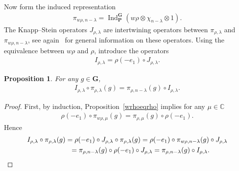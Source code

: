 \documentclass[10pt,a4paper]{amsart}
\DeclareMathOperator{\Ind}{Ind}
\numberwithin{equation}{section}
\newtheorem{prop}[theor]{Proposition}
\begin{document}
Now form the induced representation
\begin{gather*}
\pi_{w \rho, n-\lambda} =\Ind_\mathbf P^\mathbf G (w\rho\otimes \chi_{n-\lambda}\otimes 1) .
\end{gather*}
The Knapp--Stein operators $J_{\rho, \lambda}$ are intertwining operators between $\pi_{ \rho, \lambda}$ and $\pi_{w \rho, n-\lambda}$, see again~\cite{kn} for general information on these operators. Using the equivalence between $w \rho$ and $ \rho$, introduce the operators
\begin{gather*}
I_{ \rho, \lambda} = \rho(-e_1)\circ J_{ \rho, \lambda} .
\end{gather*}

\begin{prop} For any $g\in \mathbf G$,
\begin{gather*}
I_{ \rho,\lambda}\circ \pi_{ \rho,\lambda}(g) = \pi_{ \rho, n-\lambda}(g) \circ I_{ \rho,\lambda} .
\end{gather*}
\end{prop}

\begin{proof}
First, by induction, Proposition~\ref{wrhoeqrho} implies for any $\mu\in \mathbb C$
\begin{gather*}
\rho(-e_1) \circ \pi_{w \rho,\mu}(g) = \pi_{ \rho,\mu}(g)\circ \rho(-e_1) .
\end{gather*}
Hence
\begin{gather*}
I_{\rho,\lambda}\circ\pi_{\rho,\lambda}(g) = \rho(-e_1) \circ J_{\rho,\lambda}\circ \pi_{\rho,\lambda}(g) = \rho(-e_1)\circ \pi_{w \rho, n-\lambda}(g) \circ J_{\rho,\lambda}
\\ \hphantom{I_{ \rho,\lambda}\circ\pi_{\rho,\lambda}(g) }
{}=\pi_{ \rho,n-\lambda}(g) \circ \rho(-e_1)\circ J_{\rho,\lambda} = \pi_{\rho, n-\lambda}(g) \circ I_{\rho,\lambda}. \tag*{\qed}
\end{gather*}
\renewcommand{\qed}{}
\end{proof}
\end{document}
